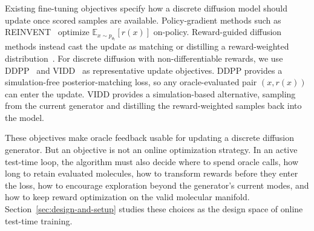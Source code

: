 \documentclass{article}
\begin{document}
Existing fine-tuning objectives specify how a discrete diffusion model should update once scored samples are available. Policy-gradient methods such as REINVENT~\citep{olivecronaMolecularNovoDesign2017} optimize $\mathbb{E}_{x\sim p_{\theta_t}}[r(x)]$ on-policy. Reward-guided diffusion methods instead cast the update as matching or distilling a reward-weighted distribution~\citep{wangFineTuningDiscreteDiffusion2024, ueharaRewardGuidedIterativeRefinement2025, ueharaFeedbackEfficientOnline2024, santiFlowDensityControl, tangTR2D2TreeSearch2025, ueharaInferenceTimeAlignmentDiffusion2025}. For discrete diffusion with non-differentiable rewards, we use DDPP~\citep{rector-brooksSteeringMaskedDiscrete2024} and VIDD~\citep{suIterativeDistillationRewardGuided2025} as representative update objectives. DDPP provides a simulation-free posterior-matching loss, so any oracle-evaluated pair $(x,r(x))$ can enter the update. VIDD provides a simulation-based alternative, sampling from the current generator and distilling the reward-weighted samples back into the model.

These objectives make oracle feedback usable for updating a discrete diffusion generator. But an objective is not an online optimization strategy. In an active test-time loop, the algorithm must also decide where to spend oracle calls, how long to retain evaluated molecules, how to transform rewards before they enter the loss, how to encourage exploration beyond the generator's current modes, and how to keep reward optimization on the valid molecular manifold. Section~\ref{sec:design-and-setup} studies these choices as the design space of online test-time training.

\end{document}
